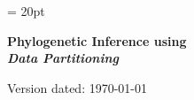 \documentclass[11pt]{article}
\begin{document}
\renewcommand{\headrulewidth}{0.5pt}
\headsep = 20pt
\lhead{ }

\thispagestyle{plain}
\begin{center}

\textbf{\LARGE Phylogenetic Inference using \RevBayes}\\\vspace{2mm}
\textbf{\it{\Large Data Partitioning}}\\\vspace{2mm}
\end{center}

\def \ResourcePath {./}
\def \GlobalResourcePath {../}


Version dated: \today
\end{document}
